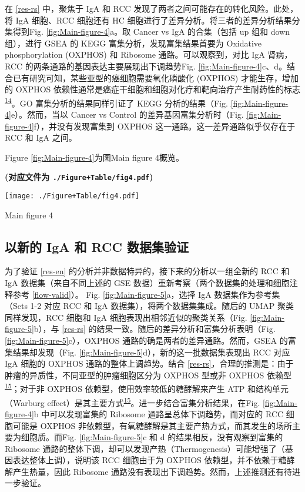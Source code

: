 \documentclass[
]{article}
\begin{document}
在 \ref{res-rs} 中，聚焦于 IgA 和 RCC 发现了两者之间可能存在的转化风险。此处，将 IgA 细胞、RCC 细胞还有 HC 细胞进行了差异分析。将三者的差异分析结果分集得到Fig. \ref{fig:Main-figure-4}a。取 Cancer vs IgA 的合集（包括 up 组和 down 组），进行 GSEA 的 KEGG 富集分析，发现富集结果首要为 Oxidative phosphorylation (OXPHOS) 和 Ribosome 通路。可以观察到，对比 IgA 肾病，RCC 的两条通路的基因表达主要展现出下调趋势Fig. \ref{fig:Main-figure-4}c、d。结合已有研究可知，某些亚型的癌细胞需要氧化磷酸化 (OXPHOS) 才能生存，增加的 OXPHOS 依赖性通常是癌症干细胞和细胞对化疗和靶向治疗产生耐药性的标志\textsuperscript{\protect\hyperlink{ref-WhyAllTheFusXuYi2020}{14}}。GO 富集分析的结果同样引证了 KEGG 分析的结果（Fig. \ref{fig:Main-figure-4}e）。然而，当以 Cancer vs Control 的差异基因富集分析时（Fig. \ref{fig:Main-figure-4}f），并没有发现富集到 OXPHOS 这一通路。这一差异通路似乎仅存在于 RCC 和 IgA 之间。

Figure \ref{fig:Main-figure-4}为图Main figure 4概览。

\textbf{(对应文件为 \texttt{./Figure+Table/fig4.pdf})}

\def\@captype{figure}
\begin{center}
\texttt{[image: ./Figure+Table/fig4.pdf]}
\caption{Main figure 4}\label{fig:Main-figure-4}
\end{center}

\hypertarget{res-valid}{%
\subsection{以新的 IgA 和 RCC 数据集验证}\label{res-valid}}

为了验证 \ref{res-en} 的分析并非数据特异的，接下来的分析以一组全新的 RCC 和 IgA 数据集（来自不同上述的 GSE 数据）重新考察（两个数据集的处理和细胞注释参考 \ref{flow-valid}）。
Fig. \ref{fig:Main-figure-5}a，选择 IgA 数据集作为参考集（Sets 1-2 对应 RCC 和 IgA 数据集），将两个数据集集成。随后的 UMAP 聚类同样发现，RCC 细胞和 IgA 细胞表现出相邻近似的聚类关系（Fig. \ref{fig:Main-figure-5}b），与 \ref{res-rs} 的结果一致。随后的差异分析和富集分析表明（Fig. \ref{fig:Main-figure-5}c），OXPHOS 通路的确是两者的差异通路。然而，GSEA 的富集结果却发现（Fig. \ref{fig:Main-figure-5}d），新的这一批数据集表现出 RCC 对应 IgA 细胞的 OXPHOS 通路的整体上调趋势。结合 \ref{res-rs}，合理的推测是：由于肿瘤的异质性，不同亚型的肿瘤细胞区分为 OXPHOS 型或非 OXPHOS 依赖型\textsuperscript{\protect\hyperlink{ref-HallmarksOfCaSancho2016}{15}}；对于非 OXPHOS 依赖型，使用效率较低的糖酵解来产生 ATP 和结构单元（Warburg effect）是其主要方式\textsuperscript{\protect\hyperlink{ref-HallmarksOfCaSancho2016}{15}}。进一步结合富集分析结果，在Fig. \ref{fig:Main-figure-4}b 中可以发现富集的 Ribosome 通路呈总体下调趋势，而对应的 RCC 细胞可能是 OXPHOS 非依赖型，有氧糖酵解是其主要产热方式，而其发生的场所主要为细胞质。而Fig. \ref{fig:Main-figure-5}c 和 d 的结果相反，没有观察到富集的 Ribosome 通路的整体下调，却可以发现产热（Thermogenesis）可能增强了（基因表达整体上调），说明该 RCC 细胞由于为 OXPHOS 依赖型，并不依赖于糖酵解产生热量，因此 Ribosome 通路没有表现出下调趋势。然而，上述推测还有待进一步验证。
\end{document}
